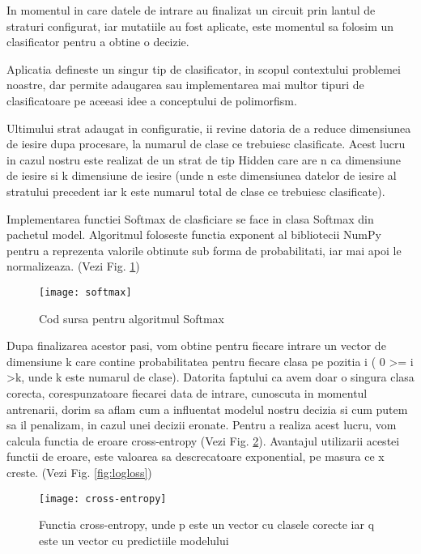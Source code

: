 	In momentul in care datele de intrare au finalizat un circuit prin lantul de straturi configurat, iar mutatiile au fost aplicate, este momentul sa folosim un clasificator pentru a obtine o decizie. 
	
	Aplicatia defineste un singur tip de clasificator, in scopul contextului problemei noastre, dar permite adaugarea sau implementarea mai multor tipuri de clasificatoare pe aceeasi idee a conceptului de polimorfism. 
	
	Ultimului strat adaugat in configuratie, ii revine datoria de a reduce dimensiunea de iesire dupa procesare, la numarul de clase ce trebuiesc clasificate. Acest lucru in cazul nostru este realizat de un strat de tip Hidden care are n ca dimensiune de iesire si k dimensiune de iesire (unde n este dimensiunea datelor de iesire al stratului precedent iar k este numarul total de clase ce trebuiesc clasificate).
	 
	Implementarea functiei Softmax de clasficiare se face in clasa Softmax din pachetul model. Algoritmul foloseste functia exponent al bibliotecii NumPy pentru a reprezenta valorile obtinute sub forma de probabilitati, iar mai apoi le normalizeaza. (Vezi Fig. \ref{fig:softmax})
	
	\vfill
	
	\begin{figure}[H]
		\texttt{[image: softmax]}
		\caption{\label{fig:softmax} Cod sursa pentru algoritmul Softmax}
	\end{figure}

	\newpage
	
	Dupa finalizarea acestor pasi, vom obtine pentru fiecare intrare un vector de dimensiune k care contine probabilitatea pentru fiecare clasa pe pozitia i ( 0 >= i >k, unde k este numarul de clase). Datorita faptului ca avem doar o singura clasa corecta, corespunzatoare fiecarei data de intrare, cunoscuta in momentul antrenarii, dorim sa aflam cum a influentat modelul nostru decizia si cum putem sa il penalizam, in cazul unei decizii eronate. Pentru a realiza acest lucru, vom calcula functia de eroare cross-entropy (Vezi Fig. \ref{fig:cross-entropy}). Avantajul utilizarii acestei functii de eroare, este valoarea sa descrecatoare exponential, pe masura ce x creste. (Vezi Fig. \ref{fig:logloss})
	
	\begin{figure}[H]
		\texttt{[image: cross-entropy]}
		\caption{\label{fig:cross-entropy} Functia cross-entropy, unde p este un vector cu clasele corecte iar q este un vector cu predictiile modelului}
	\end{figure}	
	

